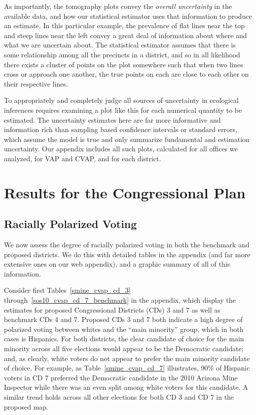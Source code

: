 \documentclass[12pt]{article}
\begin{document}
As importantly, the tomography plots convey the \emph{overall
  uncertainty} in the available data, and how our statistical
estimator uses that information to produce an estimate.  In this
particular example, the prevalence of flat lines near the top and
steep lines near the left convey a great deal of information about
where and what we are uncertain about.  The statistical estimator
assumes that there is some relationship among all the precincts in a
district, and so in all likelihood there exists a cluster of points on
the plot somewhere such that when two lines cross or approach one
another, the true points on each are close to each other on their
respective lines.  

To appropriately and completely judge all sources of uncertainty in
ecological inferences requires examining a plot like this for each
numerical quantity to be estimated.  The uncertainty estimates here
are far more informative and information rich than sampling based
confidence intervals or standard errors, which assume the model is
true and only summarize fundamental and estimation uncertainty.  Our
appendix includes all such plots, calculated for all offices we
analyzed, for VAP and CVAP, and for each district.

\section{Results for the Congressional Plan}\label{s:res}

\subsection{Racially Polarized Voting}

We now assess the degree of racially polarized voting in both the
benchmark and proposed districts.  We do this with detailed tables in
the appendix (and far more extensive ones on our web appendix), and a
graphic summary of all of this information.

Consider first Tables~\ref{smine_cvap_cd_3}
through~\ref{sos10_cvap_cd_7_benchmark} in the appendix, which display
the estimates for proposed Congressional Districts (CDs) 3 and 7 as
well as benchmark CDs 4 and 7. Proposed CDs 3 and 7 both indicate a
high degree of polarized voting between whites and the ``main
minority'' group, which in both cases is Hispanics. For both
districts, the clear candidate of choice for the main minority across
all five elections would appear to be the Democratic candidate; and,
as clearly, white voters do not appear to prefer the main minority
candidate of choice. For example, as Table~\ref{smine_cvap_cd_7}
illustrates, 90\% of Hispanic voters in CD 7 preferred the Democratic
candidate in the 2010 Arizona Mine Inspector while there was an even
split among white voters for this candidate. A similar trend holds
across all other elections for both CD 3 and CD 7 in the proposed map.
\end{document}
